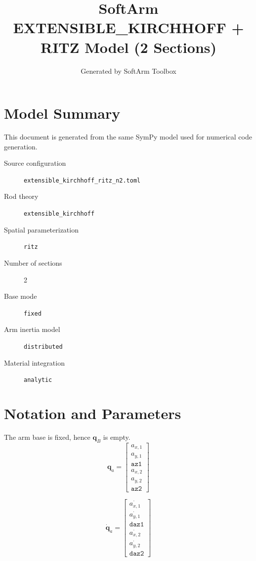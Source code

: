 \documentclass[11pt]{article}
\title{SoftArm EXTENSIBLE\_KIRCHHOFF + RITZ Model (2 Sections)}
\author{Generated by SoftArm Toolbox}
\date{}
\begin{document}
\maketitle

\section{Model Summary}
This document is generated from the same SymPy model used for numerical code generation.
\begin{description}
\item[Source configuration] \texttt{extensible\_kirchhoff\_ritz\_n2.toml}
\item[Rod theory] \texttt{extensible\_kirchhoff}
\item[Spatial parameterization] \texttt{ritz}
\item[Number of sections] 2
\item[Base mode] \texttt{fixed}
\item[Arm inertia model] \texttt{distributed}
\item[Material integration] \texttt{analytic}
\end{description}

\section{Notation and Parameters}
The arm base is fixed, hence $\boldsymbol q_B$ is empty.
\begin{equation}
\boldsymbol q_a=\begin{bmatrix}a_{x,1}\\a_{y,1}\\\mathtt{az1}\\a_{x,2}\\a_{y,2}\\\mathtt{az2}\end{bmatrix}
\end{equation}

\begin{equation}
\dot{\boldsymbol q}_a=\begin{bmatrix}\dot{a_{x,1}}\\\dot{a_{y,1}}\\\mathtt{daz1}\\\dot{a_{x,2}}\\\dot{a_{y,2}}\\\mathtt{daz2}\end{bmatrix}
\end{equation}
\end{document}
